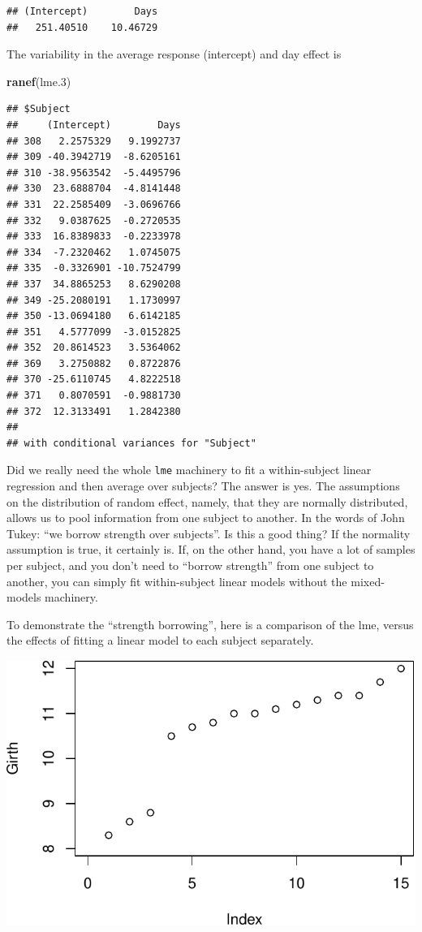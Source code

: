 \documentclass[]{book}
\newenvironment{Shaded}{\begin{snugshade}}{\end{snugshade}}
\newcommand{\FloatTok}[1]{\textcolor[rgb]{0.00,0.00,0.81}{#1}}
\newcommand{\KeywordTok}[1]{\textcolor[rgb]{0.13,0.29,0.53}{\textbf{#1}}}
\newcommand{\NormalTok}[1]{#1}
\theoremstyle{definition}
\theoremstyle{definition}
\theoremstyle{definition}
\theoremstyle{remark}
\begin{document}
\begin{verbatim}
## (Intercept)        Days 
##   251.40510    10.46729
\end{verbatim}

The variability in the average response (intercept) and day effect is

\begin{Shaded}
\begin{Highlighting}[]
\KeywordTok{ranef}\NormalTok{(lme}\FloatTok{.3}\NormalTok{)}
\end{Highlighting}
\end{Shaded}

\begin{verbatim}
## $Subject
##     (Intercept)        Days
## 308   2.2575329   9.1992737
## 309 -40.3942719  -8.6205161
## 310 -38.9563542  -5.4495796
## 330  23.6888704  -4.8141448
## 331  22.2585409  -3.0696766
## 332   9.0387625  -0.2720535
## 333  16.8389833  -0.2233978
## 334  -7.2320462   1.0745075
## 335  -0.3326901 -10.7524799
## 337  34.8865253   8.6290208
## 349 -25.2080191   1.1730997
## 350 -13.0694180   6.6142185
## 351   4.5777099  -3.0152825
## 352  20.8614523   3.5364062
## 369   3.2750882   0.8722876
## 370 -25.6110745   4.8222518
## 371   0.8070591  -0.9881730
## 372  12.3133491   1.2842380
## 
## with conditional variances for "Subject"
\end{verbatim}

Did we really need the whole \texttt{lme} machinery to fit a within-subject linear regression and then average over subjects?
The answer is yes.
The assumptions on the distribution of random effect, namely, that they are normally distributed, allows us to pool information from one subject to another. In the words of John Tukey: ``we borrow strength over subjects''.
Is this a good thing? If the normality assumption is true, it certainly is.
If, on the other hand, you have a lot of samples per subject, and you don't need to ``borrow strength'' from one subject to another, you can simply fit within-subject linear models without the mixed-models machinery.

To demonstrate the ``strength borrowing'', here is a comparison of the lme, versus the effects of fitting a linear model to each subject separately.

\includegraphics[width=0.5\linewidth]{Rcourse_files/figure-latex/unnamed-chunk-214-1}
\end{document}
